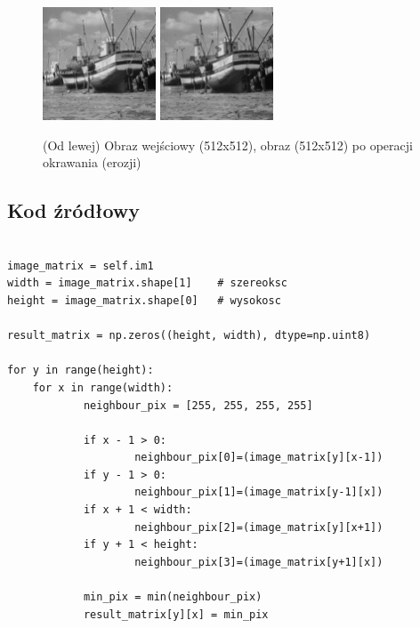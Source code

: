 \documentclass[final,a4paper,openany,12pt]{mwbk}
\begin{document}
\begin{figure}[H]
	\begin{center}
		\includegraphics[width=0.3\textwidth]{2/2Gray_E_Original}
		\includegraphics[width=0.3\textwidth]{2/2Gray_E_Result}
	\end{center}
	\caption{(Od lewej) Obraz wejściowy (512x512), obraz (512x512) po operacji okrawania (erozji) }
\end{figure}


\subsection*{Kod źródłowy}

\begin{lstlisting}[caption= Operacja okrawania (erozji) na obrazie szarym]

image_matrix = self.im1
width = image_matrix.shape[1]    # szereoksc
height = image_matrix.shape[0]   # wysokosc

result_matrix = np.zeros((height, width), dtype=np.uint8)

for y in range(height):
    for x in range(width):  
            neighbour_pix = [255, 255, 255, 255]

            if x - 1 > 0:
                    neighbour_pix[0]=(image_matrix[y][x-1])
            if y - 1 > 0:
                    neighbour_pix[1]=(image_matrix[y-1][x])
            if x + 1 < width:
                    neighbour_pix[2]=(image_matrix[y][x+1])
            if y + 1 < height:
                    neighbour_pix[3]=(image_matrix[y+1][x])

            min_pix = min(neighbour_pix)
            result_matrix[y][x] = min_pix

\end{lstlisting}
\newpage
\end{document}
